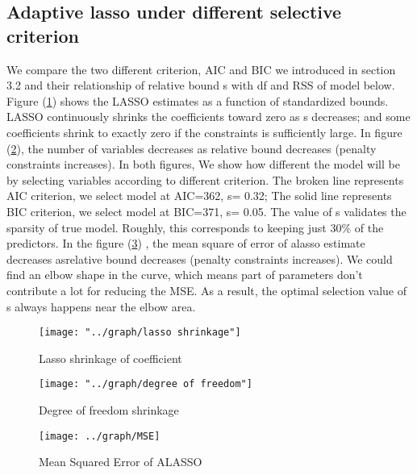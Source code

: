 \documentclass[titlepage,11pt]{article}
\begin{document}
\subsection{Adaptive lasso under different selective criterion}
We compare the two different criterion, AIC and BIC we introduced in section 3.2 and their relationship of relative bound s with df and RSS of model below. Figure (\ref{fig:lassoshrinkage})  shows the LASSO estimates as a function of standardized bounds. LASSO continuously shrinks the coefficients toward zero as s decreases; and some coefficients shrink to exactly zero if the constraints is sufficiently large. In  figure (\ref{fig:degreeoffreedom}), the number of variables decreases as relative bound  decreases  (penalty constraints increases).  In both figures, We show how different the model will be by selecting variables according to different criterion. The broken line represents AIC criterion, we select model at AIC=362, s= 0.32; The  solid line represents BIC criterion, we select model at BIC=371, s= 0.05. The value of s validates the sparsity of true model. Roughly, this corresponds to keeping just $30\%$  of the predictors.  In the figure (\ref{fig:MSE}) , the mean square of error of alasso estimate decreases asrelative bound  decreases  (penalty constraints increases). We could find an elbow shape in the curve, which means part of parameters don't contribute a lot for reducing the MSE. As a result, the optimal selection value of s always happens near the elbow area. 
 
 \begin{figure} [!htbp]
 	\centering
 	\texttt{[image: "../graph/lasso shrinkage"]}
 	\caption{Lasso shrinkage of coefficient}
 	\label{fig:lassoshrinkage}
 	
 \end{figure}
 
 \begin{figure} [!htbp]
 	\centering
 	\texttt{[image: "../graph/degree of freedom"]}
 	\caption{Degree of freedom shrinkage}
 	\label{fig:degreeoffreedom}
 \end{figure}
 
 \begin{figure} [!htbp]
 	\centering
 	\texttt{[image: ../graph/MSE]}
 	\caption{Mean Squared Error of ALASSO}
 	\label{fig:MSE}
 \end{figure}
 
\end{document}
